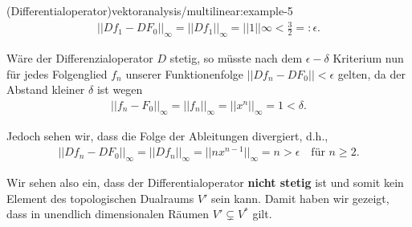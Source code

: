 \begin{example}{(Differentialoperator)}{vektoranalysis/multilinear:example-5}
\begin{align*}
||Df_1 - DF_0||_\infty = ||Df_1||_\infty = ||1||\infty < \frac{3}{2} =: \epsilon.
\end{align*}
\par
Wäre der Differenzialoperator \(D\) stetig, so müsste nach dem \(\epsilon-\delta\) Kriterium nun für jedes Folgenglied \(f_n\) unserer Funktionenfolge \(||Df_n - DF_0|| < \epsilon\) gelten, da der Abstand kleiner \(\delta\) ist wegen
\begin{align*}
||f_n - F_0||_\infty = ||f_n||_\infty = ||x^n||_\infty = 1 < \delta.
\end{align*}
\par
Jedoch sehen wir, dass die Folge der Ableitungen divergiert, d.h.,
\begin{align*}
||Df_n - DF_0||_\infty = ||Df_n||_\infty = ||nx^{n-1}||_\infty = n > \epsilon \quad \text{für } n\geq 2.
\end{align*}
\par
Wir sehen also ein, dass der Differentialoperator \textbf{nicht stetig} ist und somit kein Element des topologischen Dualraums \(V'\) sein kann.
Damit haben wir gezeigt, dass in unendlich dimensionalen Räumen \(V' \subsetneq V^\ast\) gilt.
\end{example}



